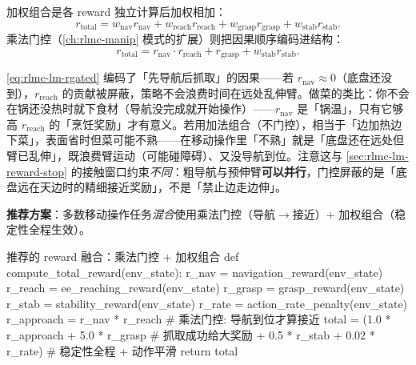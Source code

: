 加权组合是各 reward 独立计算后加权相加：
\begin{equation}
r_{\text{total}} = w_{\text{nav}}r_{\text{nav}} + w_{\text{reach}}r_{\text{reach}} + w_{\text{grasp}}r_{\text{grasp}} + w_{\text{stab}}r_{\text{stab}}.
\label{eq:rlmc-lm-rweighted}
\end{equation}
乘法门控（\cref{ch:rlmc-manip} 模式的扩展）则把因果顺序编码进结构：
\begin{equation}
r_{\text{total}} = r_{\text{nav}}\cdot r_{\text{reach}} + r_{\text{grasp}} + w_{\text{stab}}r_{\text{stab}}.
\label{eq:rlmc-lm-rgated}
\end{equation}

\begin{insight}\label{ins:rlmc-lm-gate}
\cref{eq:rlmc-lm-rgated} 编码了「先导航后抓取」的因果——若 $r_{\text{nav}}\approx 0$（底盘还没到），$r_{\text{reach}}$ 的贡献被屏蔽，策略不会浪费时间在远处乱伸臂。做菜的类比：你不会在锅还没热时就下食材（导航没完成就开始操作）——$r_{\text{nav}}$ 是「锅温」，只有它够高 $r_{\text{reach}}$ 的「烹饪奖励」才有意义。若用加法组合（不门控），相当于「边加热边下菜」，表面省时但菜可能不熟——在移动操作里「不熟」就是「底盘还在远处但臂已乱伸」，既浪费臂运动（可能碰障碍）、又没导航到位。注意这与 \cref{sec:rlmc-lm-reward-stop} 的接触窗口约束\emph{不同}：粗导航与预伸臂\textbf{可以并行}，门控屏蔽的是「底盘远在天边时的精细接近奖励」，不是「禁止边走边伸」。
\end{insight}

\textbf{推荐方案}：多数移动操作任务\emph{混合}使用乘法门控（导航$\to$接近）+ 加权组合（稳定性全程生效）。

\begin{codebox}[Python]{推荐的 reward 融合：乘法门控 + 加权组合}
def compute_total_reward(env_state):
    r_nav   = navigation_reward(env_state)
    r_reach = ee_reaching_reward(env_state)
    r_grasp = grasp_reward(env_state)
    r_stab  = stability_reward(env_state)
    r_rate  = action_rate_penalty(env_state)
    r_approach = r_nav * r_reach            # 乘法门控: 导航到位才算接近
    total = (1.0 * r_approach + 5.0 * r_grasp     # 抓取成功给大奖励
             + 0.5 * r_stab + 0.02 * r_rate)      # 稳定性全程 + 动作平滑
    return total
\end{codebox}

